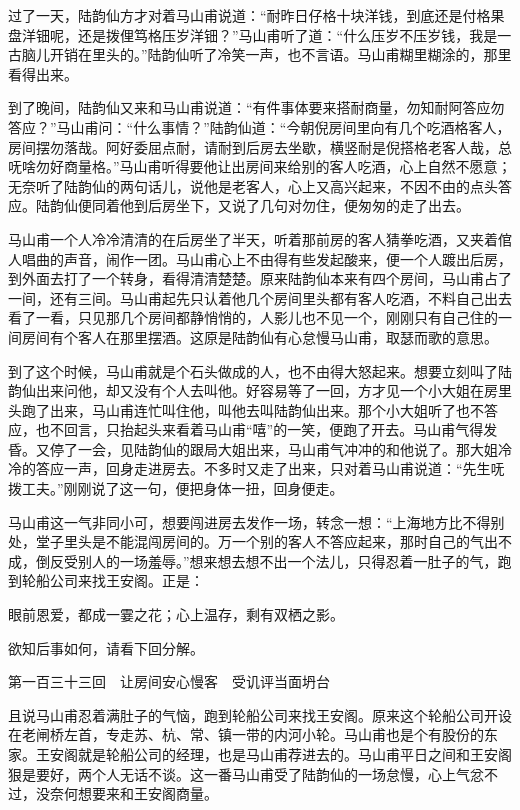 \documentclass[12pt,UTF8]{ctexbook}
\begin{document}
{{{过了一天，陆韵仙方才对着马山甫说道：“耐昨日仔格十块洋钱，到底还是付格果盘洋钿呢，还是拨俚笃格压岁洋钿？”马山甫听了道：“什么压岁不压岁钱，我是一古脑儿开销在里头的。”陆韵仙听了冷笑一声，也不言语。马山甫糊里糊涂的，那里看得出来。

到了晚间，陆韵仙又来和马山甫说道：“有件事体要来搭耐商量，勿知耐阿答应勿答应？”马山甫问：“什么事情？”陆韵仙道：“今朝倪房间里向有几个吃酒格客人，房间摆勿落哉。阿好委屈点耐，请耐到后房去坐歇，横竖耐是倪搭格老客人哉，总呒啥勿好商量格。”马山甫听得要他让出房间来给别的客人吃酒，心上自然不愿意；无奈听了陆韵仙的两句话儿，说他是老客人，心上又高兴起来，不因不由的点头答应。陆韵仙便同着他到后房坐下，又说了几句对勿住，便匆匆的走了出去。

马山甫一个人冷冷清清的在后房坐了半天，听着那前房的客人猜拳吃酒，又夹着倌人唱曲的声音，闹作一团。马山甫心上不由得有些发起酸来，便一个人踱出后房，到外面去打了一个转身，看得清清楚楚。原来陆韵仙本来有四个房间，马山甫占了一间，还有三间。马山甫起先只认着他几个房间里头都有客人吃酒，不料自己出去看了一看，只见那几个房间都静悄悄的，人影儿也不见一个，刚刚只有自己住的一间房间有个客人在那里摆酒。这原是陆韵仙有心怠慢马山甫，取瑟而歌的意思。

到了这个时候，马山甫就是个石头做成的人，也不由得大怒起来。想要立刻叫了陆韵仙出来问他，却又没有个人去叫他。好容易等了一回，方才见一个小大姐在房里头跑了出来，马山甫连忙叫住他，叫他去叫陆韵仙出来。那个小大姐听了也不答应，也不回言，只抬起头来看着马山甫“嘻”的一笑，便跑了开去。马山甫气得发昏。又停了一会，见陆韵仙的跟局大姐出来，马山甫气冲冲的和他说了。那大姐冷冷的答应一声，回身走进房去。不多时又走了出来，只对着马山甫说道：“先生呒拨工夫。”刚刚说了这一句，便把身体一扭，回身便走。

马山甫这一气非同小可，想要闯进房去发作一场，转念一想：“上海地方比不得别处，堂子里头是不能混闯房间的。万一个别的客人不答应起来，那时自己的气出不成，倒反受别人的一场羞辱。”想来想去想不出一个法儿，只得忍着一肚子的气，跑到轮船公司来找王安阁。正是：

眼前恩爱，都成一霎之花；心上温存，剩有双栖之影。

欲知后事如何，请看下回分解。





第一百三十三回　让房间安心慢客　受讥评当面坍台





且说马山甫忍着满肚子的气恼，跑到轮船公司来找王安阁。原来这个轮船公司开设在老闸桥左首，专走苏、杭、常、镇一带的内河小轮。马山甫也是个有股份的东家。王安阁就是轮船公司的经理，也是马山甫荐进去的。马山甫平日之间和王安阁狠是要好，两个人无话不谈。这一番马山甫受了陆韵仙的一场怠慢，心上气忿不过，没奈何想要来和王安阁商量。

}}}
\end{document}
